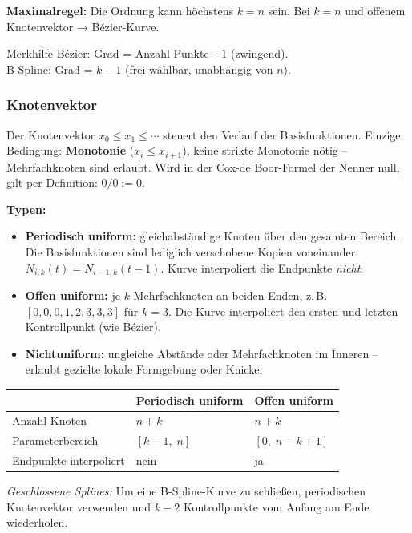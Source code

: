 \documentclass[12pt, a4paper]{article}
\begin{document}
\textbf{Maximalregel:} Die Ordnung kann höchstens $k = n$ sein. Bei $k = n$ und offenem Knotenvektor → Bézier-Kurve.

\begin{notebox}{Merkhilfe}
Bézier: Grad = Anzahl Punkte $- 1$ (zwingend). \\
B-Spline: Grad = $k-1$ (frei wählbar, unabhängig von $n$).
\end{notebox}

\subsubsection*{Knotenvektor}

Der Knotenvektor $x_0 \leq x_1 \leq \cdots$ steuert den Verlauf der Basisfunktionen. Einzige Bedingung: \textbf{Monotonie} ($x_i \leq x_{i+1}$), keine strikte Monotonie nötig -- Mehrfachknoten sind erlaubt. Wird in der Cox-de Boor-Formel der Nenner null, gilt per Definition: $0/0 := 0$.

\textbf{Typen:}
\begin{itemize}
  \item \textbf{Periodisch uniform:} gleichabständige Knoten über den gesamten Bereich. Die Basisfunktionen sind lediglich verschobene Kopien voneinander: $N_{i,k}(t) = N_{i-1,k}(t-1)$. Kurve interpoliert die Endpunkte \textit{nicht}.
  \item \textbf{Offen uniform:} je $k$ Mehrfachknoten an beiden Enden, z.\,B.\ $[0,0,0,1,2,3,3,3]$ für $k=3$. Die Kurve interpoliert den ersten und letzten Kontrollpunkt (wie Bézier).
  \item \textbf{Nichtuniform:} ungleiche Abstände oder Mehrfachknoten im Inneren -- erlaubt gezielte lokale Formgebung oder Knicke.
\end{itemize}

\begin{center}
\begin{tabular}{lll}
  & \textbf{Periodisch uniform} & \textbf{Offen uniform} \\
  \hline
  Anzahl Knoten & $n + k$ & $n + k$ \\
  Parameterbereich & $[k-1,\; n]$ & $[0,\; n-k+1]$ \\
  Endpunkte interpoliert & nein & ja \\
\end{tabular}
\end{center}

\textit{Geschlossene Splines:} Um eine B-Spline-Kurve zu schließen, periodischen Knotenvektor verwenden und $k-2$ Kontrollpunkte vom Anfang am Ende wiederholen.
\end{document}
